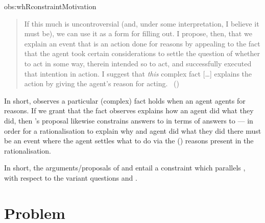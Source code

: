 \begin{note}
\begin{motivation}{obs:whRconstraintMotivation}
\begin{quote}
      If this much is uncontroversial (and, under some interpretation, I believe it must be), we can use it as a form for filling out.
      I propose, then, that we explain an event that is an action done for reasons by appealing to the fact that the agent took certain considerations to settle the question of whether to act in some way, therein intended so to act, and successfully executed that intention in action.
      I suggest that \emph{this} complex fact [\dots] explains the action by giving the agent's reason for acting.%
      \mbox{ }\hfill\mbox{(\citeyear[421]{Hieronymi:2011aa})}
    \end{quote}
    In short, \citeauthor{Hieronymi:2011aa} observes a particular (complex) fact holds when an agent agents for reasons.
    If we grant that the fact \citeauthor{Hieronymi:2011aa} observes explains how an agent did what they did, then \citeauthor{Hieronymi:2011aa}'s proposal likewise constrains answers to \qWhyR{} in terms of answers to \qHowR{} --- in order for a rationalisation to explain why and agent did what they did there must be an event where the agent settles what to do via the (\agents{}) reasons present in the rationalisation.
  \end{motivation}

  \noindent%
  In short, the arguments/proposals of \citeauthor{Davidson:1963aa} and \citeauthor{Hieronymi:2011aa} entail a constraint which parallels \issueInclusion{}, with respect to the variant questions \qWhyR{} and \qHowR{}.
\end{note}


\section{Problem}
\label{sec:problem}


